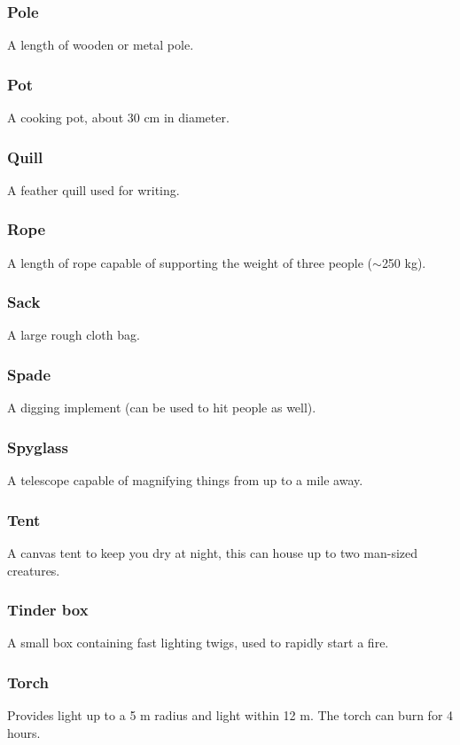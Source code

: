 \documentclass[a4paper,11pt,oneside]{book}
\newcommand{\textlf}[1]{\textbf{\titlecap{#1}}}
\begin{document}
\subsubsection{Pole}
A length of wooden or metal pole.

\subsubsection{Pot}
A cooking pot, about 30 cm in diameter.

\subsubsection{Quill}
A feather quill used for writing.

\subsubsection{Rope}
A length of rope capable of supporting the weight of three people ($\sim$250 kg).

\subsubsection{Sack}
A large rough cloth bag.

\subsubsection{Spade}
A digging implement (can be used to hit people as well).

\subsubsection{Spyglass}
A telescope capable of magnifying things from up to a mile away.

\subsubsection{Tent}
A canvas tent to keep you dry at night, this can house up to two man-sized creatures.

\subsubsection{Tinder box}
A small box containing fast lighting twigs, used to rapidly start a fire.

\subsubsection{Torch}
Provides \textlf{full} light up to a 5 m radius and \textlf{low} light within 12 m. The torch can burn for 4 hours.
\end{document}
